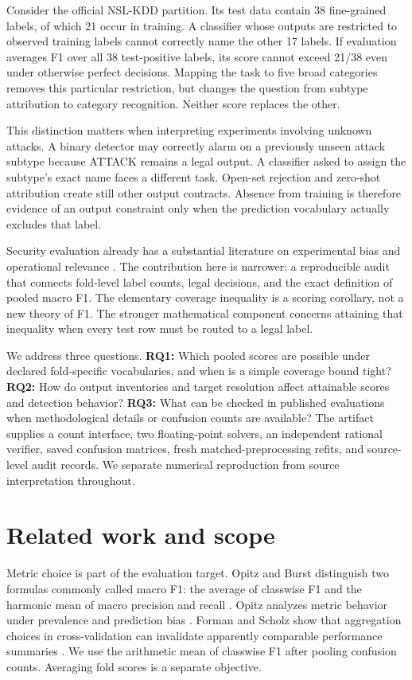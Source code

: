 \documentclass[twocolumn]{svjour3}
\begin{document}
Consider the official NSL-KDD partition. Its test data contain 38 fine-grained labels, of which 21 occur in training. A classifier whose outputs are restricted to observed training labels cannot correctly name the other 17 labels. If evaluation averages F1 over all 38 test-positive labels, its score cannot exceed 21/38 even under otherwise perfect decisions. Mapping the task to five broad categories removes this particular restriction, but changes the question from subtype attribution to category recognition. Neither score replaces the other.

This distinction matters when interpreting experiments involving unknown attacks. A binary detector may correctly alarm on a previously unseen attack subtype because ATTACK remains a legal output. A classifier asked to assign the subtype's exact name faces a different task. Open-set rejection and zero-shot attribution create still other output contracts. Absence from training is therefore evidence of an output constraint only when the prediction vocabulary actually excludes that label.

Security evaluation already has a substantial literature on experimental bias and operational relevance \cite{sommer2010} \cite{arp2022}. The contribution here is narrower: a reproducible audit that connects fold-level label counts, legal decisions, and the exact definition of pooled macro F1. The elementary coverage inequality is a scoring corollary, not a new theory of F1. The stronger mathematical component concerns attaining that inequality when every test row must be routed to a legal label.

We address three questions. \textbf{RQ1:} Which pooled scores are possible under declared fold-specific vocabularies, and when is a simple coverage bound tight? \textbf{RQ2:} How do output inventories and target resolution affect attainable scores and detection behavior? \textbf{RQ3:} What can be checked in published evaluations when methodological details or confusion counts are available? The artifact supplies a count interface, two floating-point solvers, an independent rational verifier, saved confusion matrices, fresh matched-preprocessing refits, and source-level audit records. We separate numerical reproduction from source interpretation throughout.

\section{Related work and scope}
Metric choice is part of the evaluation target. Opitz and Burst distinguish two formulas commonly called macro F1: the average of classwise F1 and the harmonic mean of macro precision and recall \cite{opitzburst2019}. Opitz analyzes metric behavior under prevalence and prediction bias \cite{opitz2024}. Forman and Scholz show that aggregation choices in cross-validation can invalidate apparently comparable performance summaries \cite{forman2010}. We use the arithmetic mean of classwise F1 after pooling confusion counts. Averaging fold scores is a separate objective.
\end{document}
